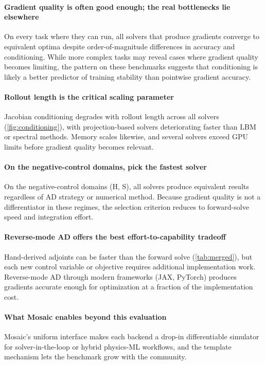 \documentclass[11pt,a4paper]{article}
\begin{document}
\paragraph{Gradient quality is often good enough; the real bottlenecks
lie elsewhere}
On every task where they can run, all solvers that produce gradients
converge to equivalent optima despite order-of-magnitude differences in
accuracy and conditioning. While more complex tasks may reveal cases
where gradient quality becomes limiting, the pattern on these benchmarks
suggests that conditioning is likely a better predictor of
training stability than pointwise gradient accuracy.

\paragraph{Rollout length is the critical scaling parameter}
Jacobian conditioning degrades with rollout length across all solvers
(\cref{fig:conditioning}), with projection-based solvers deteriorating
faster than LBM or spectral methods. Memory scales likewise, and
several solvers exceed GPU limits before gradient quality becomes
relevant.

\paragraph{On the negative-control domains, pick the fastest solver}
On the negative-control domains (H, S), all solvers produce equivalent
results regardless of AD strategy or numerical method. Because gradient
quality is not a differentiator in these regimes, the selection criterion
reduces to forward-solve speed and integration effort.

\paragraph{Reverse-mode AD offers the best effort-to-capability
tradeoff}
Hand-derived adjoints can be faster than the forward solve
(\cref{tab:merged}), but each new control variable or objective requires
additional implementation work. Reverse-mode AD through modern
frameworks (JAX, PyTorch) produces gradients accurate enough for
optimization at a fraction of the implementation cost.

\paragraph{What Mosaic enables beyond this evaluation}
Mosaic's uniform interface makes each backend a drop-in differentiable
simulator for solver-in-the-loop or hybrid physics-ML workflows,
and the template mechanism lets the benchmark grow with the community.
\end{document}
